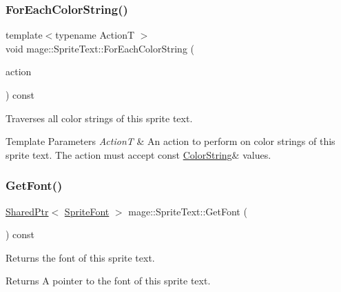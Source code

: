 \subsubsection{\texorpdfstring{For\+Each\+Color\+String()}{ForEachColorString()}\hspace{0.1cm}{\footnotesize\ttfamily [2/2]}}
{\footnotesize\ttfamily template$<$typename ActionT $>$ \\
void mage\+::\+Sprite\+Text\+::\+For\+Each\+Color\+String (\begin{DoxyParamCaption}\item[{ActionT}]{action }\end{DoxyParamCaption}) const\hspace{0.3cm}{\ttfamily [protected]}}

Traverses all color strings of this sprite text.


\begin{DoxyTemplParams}{Template Parameters}
{\em ActionT} & An action to perform on color strings of this sprite text. The action must accept {\ttfamily const} {\ttfamily \hyperlink{structmage_1_1_color_string}{Color\+String}\&} values. \\
\hline
\end{DoxyTemplParams}
\hypertarget{classmage_1_1_sprite_text_a64d0e77bafcbdf26b6c39423540e4f20}{}\label{classmage_1_1_sprite_text_a64d0e77bafcbdf26b6c39423540e4f20} 
\subsubsection{\texorpdfstring{Get\+Font()}{GetFont()}}
{\footnotesize\ttfamily \hyperlink{namespacemage_a1e01ae66713838a7a67d30e44c67703e}{Shared\+Ptr}$<$ \hyperlink{classmage_1_1_sprite_font}{Sprite\+Font} $>$ mage\+::\+Sprite\+Text\+::\+Get\+Font (\begin{DoxyParamCaption}{ }\end{DoxyParamCaption}) const\hspace{0.3cm}{\ttfamily [noexcept]}}

Returns the font of this sprite text.

\begin{DoxyReturn}{Returns}
A pointer to the font of this sprite text. 
\end{DoxyReturn}
\hypertarget{classmage_1_1_sprite_text_ab3124ee856ef6da31745af152840a8ce}{}\label{classmage_1_1_sprite_text_ab3124ee856ef6da31745af152840a8ce} 
